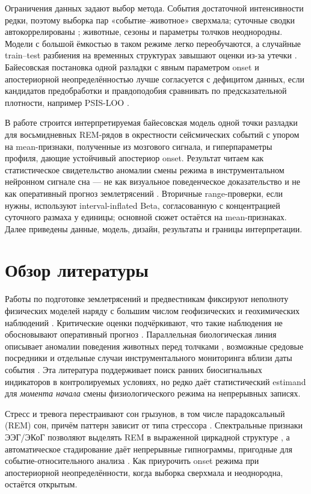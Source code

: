 Ограничения данных задают выбор метода. События достаточной интенсивности редки, поэтому выборка пар «событие–животное» сверхмала; суточные сводки автокоррелированы \cite{Hyndman2018}; животные, сезоны и параметры толчков неоднородны. Модели с большой ёмкостью в таком режиме легко переобучаются, а случайные train–test разбиения на временных структурах завышают оценки из-за утечки \cite{Bergmeir2012}. Байесовская постановка одной разладки с явным параметром onset и апостериорной неопределённостью \cite{carlin1992hierarchical,Sinkovec2022} лучше согласуется с дефицитом данных, если кандидатов предобработки и правдоподобия сравнивать по предсказательной плотности, например PSIS-LOO \cite{Vehtari2017}.

В работе строится интерпретируемая байесовская модель одной точки разладки для восьмидневных REM-рядов в окрестности сейсмических событий с упором на mean-признаки, полученные из мозгового сигнала, и гиперпараметры профиля, дающие устойчивый апостериор onset. Результат читаем как статистическое свидетельство аномалии смены режима в инструментальном нейронном сигнале сна — не как визуальное поведенческое доказательство и не как оперативный прогноз землетрясений \cite{Geller1997}. Вторичные range-проверки, если нужны, используют interval-inflated Beta, согласованную с концентрацией суточного размаха у единицы; основной сюжет остаётся на mean-признаках. Далее приведены данные, модель, дизайн, результаты и границы интерпретации.

\section{Обзор литературы}

Работы по подготовке землетрясений и предвестникам фиксируют неполноту физических моделей наряду с большим числом геофизических и геохимических наблюдений \cite{Rodkin2011,Cicerone2009,Conti2021}. Критические оценки подчёркивают, что такие наблюдения не обосновывают оперативный прогноз \cite{Geller1997,Conti2021}. Параллельная биологическая линия описывает аномалии поведения животных перед толчками \cite{Kirschvink2000}, возможные средовые посредники \cite{Grant2011} и отдельные случаи инструментального мониторинга вблизи даты события \cite{Yokoi2003}. Эта литература поддерживает поиск ранних биосигнальных индикаторов в контролируемых условиях, но редко даёт статистический estimand для \emph{момента начала} смены физиологического режима на непрерывных записях.

Стресс и тревога перестраивают сон грызунов, в том числе парадоксальный (REM) сон, причём паттерн зависит от типа стрессора \cite{Rampin1991,Meerlo1997,Palma2000,Sanford2003}. Спектральные признаки ЭЭГ/ЭКоГ позволяют выделять REM в выраженной циркадной структуре \cite{Fang2010,Vyazovskiy2005}, а автоматическое стадирование даёт непрерывные гипнограммы, пригодные для событие-относительного анализа \cite{Saevskiy2025}. Как приурочить onset режима при апостериорной неопределённости, когда выборка сверхмала и неоднородна, остаётся открытым.

